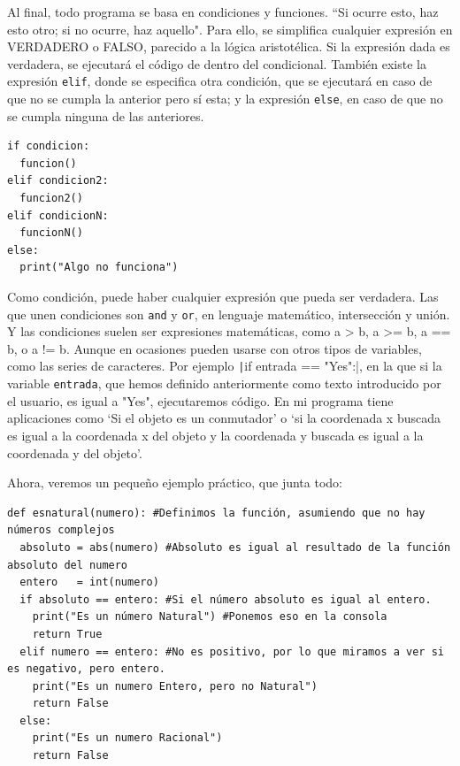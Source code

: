 \documentclass[a4paper, 11pt]{report} %
\begin{document}
Al final, todo programa se basa en condiciones y funciones. ``Si ocurre esto, haz esto otro; si no ocurre, haz aquello". Para ello, se simplifica cualquier expresión en VERDADERO o FALSO, parecido a la lógica aristotélica. Si la expresión dada es verdadera, se ejecutará el código de dentro del condicional. También existe la expresión \texttt{elif}, donde se especifica otra condición, que se ejecutará en caso de que no se cumpla la anterior pero sí esta; y la expresión \texttt{else}, en caso de que no se cumpla ninguna de las anteriores.

\newpage
\begin{verbatim}
if condicion:
  funcion()
elif condicion2:
  funcion2()
elif condicionN:
  funcionN()
else:
  print("Algo no funciona")
\end{verbatim}
Como condición, puede haber cualquier expresión que pueda ser verdadera. Las que unen condiciones son \texttt{and} y \texttt{or}, en lenguaje matemático, intersección y unión. Y las condiciones suelen ser expresiones matemáticas, como a > b, a >= b, a == b, o a != b. Aunque en ocasiones pueden usarse con otros tipos de variables, como las series de caracteres. Por ejemplo \texttt|if entrada == "Yes":|, en la que si la variable \texttt{entrada}, que hemos definido anteriormente como texto introducido por el usuario, es igual a "Yes", ejecutaremos código. En mi programa tiene aplicaciones como `Si el objeto es un conmutador' o `si la coordenada x buscada es igual a la coordenada x del objeto y la coordenada y buscada es igual a la coordenada y del objeto'.

Ahora, veremos un pequeño ejemplo práctico, que junta todo:
\begin{verbatim}
def esnatural(numero): #Definimos la función, asumiendo que no hay números complejos
  absoluto = abs(numero) #Absoluto es igual al resultado de la función absoluto del numero
  entero   = int(numero) 
  if absoluto == entero: #Si el número absoluto es igual al entero.
    print("Es un número Natural") #Ponemos eso en la consola
    return True
  elif numero == entero: #No es positivo, por lo que miramos a ver si es negativo, pero entero.
    print("Es un numero Entero, pero no Natural")
    return False
  else:
    print("Es un numero Racional")
    return False
\end{verbatim}

\newpage

\end{document}
